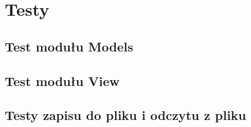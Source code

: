 \documentclass[10pt, oneside]{article}
\begin{document}
\section {Testy}

\subsection {Test modułu Models}

\subsection {Test modułu View}

\subsection {Testy zapisu do pliku i odczytu z pliku}
\end{document}
